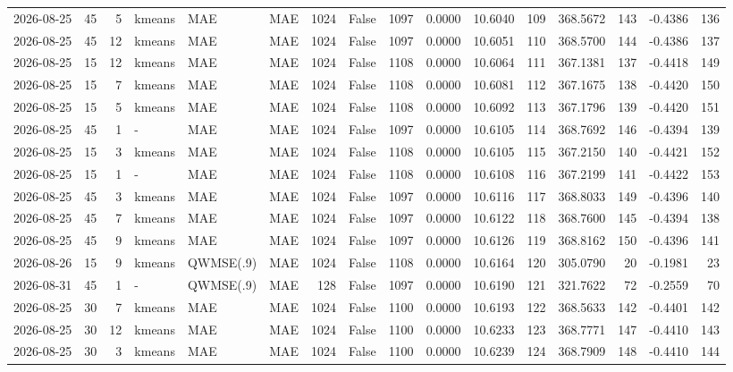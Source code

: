\documentclass[10pt]{article}
\begin{document}
\begin{landscape}
\begin{longtable}{@{}lrrlllrcrrrrrrrr@{}}
2026-08-25 & 45 & 5 & kmeans & MAE & MAE & 1024 & False & 1097 & 0.0000 & 10.6040 & 109 & 368.5672 & 143 & -0.4386 & 136 \\
2026-08-25 & 45 & 12 & kmeans & MAE & MAE & 1024 & False & 1097 & 0.0000 & 10.6051 & 110 & 368.5700 & 144 & -0.4386 & 137 \\
2026-08-25 & 15 & 12 & kmeans & MAE & MAE & 1024 & False & 1108 & 0.0000 & 10.6064 & 111 & 367.1381 & 137 & -0.4418 & 149 \\
2026-08-25 & 15 & 7 & kmeans & MAE & MAE & 1024 & False & 1108 & 0.0000 & 10.6081 & 112 & 367.1675 & 138 & -0.4420 & 150 \\
2026-08-25 & 15 & 5 & kmeans & MAE & MAE & 1024 & False & 1108 & 0.0000 & 10.6092 & 113 & 367.1796 & 139 & -0.4420 & 151 \\
2026-08-25 & 45 & 1 & - & MAE & MAE & 1024 & False & 1097 & 0.0000 & 10.6105 & 114 & 368.7692 & 146 & -0.4394 & 139 \\
2026-08-25 & 15 & 3 & kmeans & MAE & MAE & 1024 & False & 1108 & 0.0000 & 10.6105 & 115 & 367.2150 & 140 & -0.4421 & 152 \\
2026-08-25 & 15 & 1 & - & MAE & MAE & 1024 & False & 1108 & 0.0000 & 10.6108 & 116 & 367.2199 & 141 & -0.4422 & 153 \\
2026-08-25 & 45 & 3 & kmeans & MAE & MAE & 1024 & False & 1097 & 0.0000 & 10.6116 & 117 & 368.8033 & 149 & -0.4396 & 140 \\
2026-08-25 & 45 & 7 & kmeans & MAE & MAE & 1024 & False & 1097 & 0.0000 & 10.6122 & 118 & 368.7600 & 145 & -0.4394 & 138 \\
2026-08-25 & 45 & 9 & kmeans & MAE & MAE & 1024 & False & 1097 & 0.0000 & 10.6126 & 119 & 368.8162 & 150 & -0.4396 & 141 \\
2026-08-26 & 15 & 9 & kmeans & QWMSE(.9) & MAE & 1024 & False & 1108 & 0.0000 & 10.6164 & 120 & 305.0790 & 20 & -0.1981 & 23 \\
2026-08-31 & 45 & 1 & - & QWMSE(.9) & MAE & 128 & False & 1097 & 0.0000 & 10.6190 & 121 & 321.7622 & 72 & -0.2559 & 70 \\
2026-08-25 & 30 & 7 & kmeans & MAE & MAE & 1024 & False & 1100 & 0.0000 & 10.6193 & 122 & 368.5633 & 142 & -0.4401 & 142 \\
2026-08-25 & 30 & 12 & kmeans & MAE & MAE & 1024 & False & 1100 & 0.0000 & 10.6233 & 123 & 368.7771 & 147 & -0.4410 & 143 \\
2026-08-25 & 30 & 3 & kmeans & MAE & MAE & 1024 & False & 1100 & 0.0000 & 10.6239 & 124 & 368.7909 & 148 & -0.4410 & 144 \\

\end{longtable}
\end{landscape}
\end{document}
